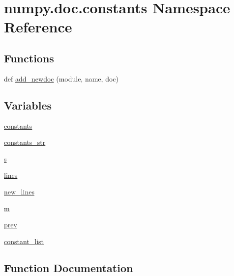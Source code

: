 \hypertarget{namespacenumpy_1_1doc_1_1constants}{}\section{numpy.\+doc.\+constants Namespace Reference}
\label{namespacenumpy_1_1doc_1_1constants}
\subsection*{Functions}
\begin{DoxyCompactItemize}
\item 
def \hyperlink{namespacenumpy_1_1doc_1_1constants_a9286a78125c5af7e49b0679ce7ae26eb}{add\+\_\+newdoc} (module, name, doc)
\end{DoxyCompactItemize}
\subsection*{Variables}
\begin{DoxyCompactItemize}
\item 
\hyperlink{namespacenumpy_1_1doc_1_1constants_a4e3c3005ef01051ac70e05718c22f8dc}{constants}
\item 
\hyperlink{namespacenumpy_1_1doc_1_1constants_ad3e993e42ed98a3d9ce4b14e84043066}{constants\+\_\+str}
\item 
\hyperlink{namespacenumpy_1_1doc_1_1constants_a1e8b941e0f23a828f1fdc40bfaf78d57}{s}
\item 
\hyperlink{namespacenumpy_1_1doc_1_1constants_a01402b553d972faf7b004eb684ad9c93}{lines}
\item 
\hyperlink{namespacenumpy_1_1doc_1_1constants_a5eaa2e37cf489853222a04621ed22962}{new\+\_\+lines}
\item 
\hyperlink{namespacenumpy_1_1doc_1_1constants_af02120b319c9258f047808929b55d862}{m}
\item 
\hyperlink{namespacenumpy_1_1doc_1_1constants_a3971dea96ec7481d3cdb1159ab2713a3}{prev}
\item 
\hyperlink{namespacenumpy_1_1doc_1_1constants_add715cf6d02ae324a5b970a0e1751d9a}{constant\+\_\+list}
\end{DoxyCompactItemize}


\subsection{Function Documentation}
\mbox{\label{namespacenumpy_1_1doc_1_1constants_a9286a78125c5af7e49b0679ce7ae26eb}} 
